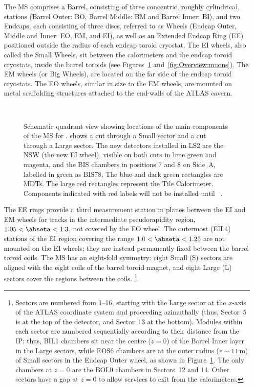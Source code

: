 \documentclass[cernpreprint, atlasdraft=false, UKenglish,british,orcidlogo, texmf, orcidlogo]{atlasdoc}
\begin{document}
The \gls{MS} comprises a Barrel, consisting of three concentric, roughly cylindrical, stations (Barrel Outer: BO, Barrel Middle: BM and Barrel Inner: BI), and two Endcaps, each consisting of three discs, referred to as Wheels (Endcap Outer, Middle and Inner: EO, EM, and EI), as well as an Extended Endcap Ring (EE) positioned outside the radius of each endcap toroid cryostat.
The EI wheels, also called the Small Wheels, sit between the calorimeters and the endcap toroid cryostats, inside the barrel toroids (see Figures~\ref{fig:Muon_quadrant} and~\ref{fig:Overview:muons}).
The EM wheels (or Big Wheels), are located on the far side of the endcap toroid cryostats. The EO wheels, similar in size to the EM wheels, are mounted on metal scaffolding structures attached to the end-walls of the ATLAS cavern.
\begin{figure}[!hp]
\centering
{} \\
 
 
\caption{Schematic quadrant view showing locations of the main components of the \gls{MS} for \RunThr. \protect{} shows a cut through a Small sector and \protect{} a cut through a Large sector. The new detectors installed in \gls{LS2} are the \gls{NSW} (the new EI wheel), visible on both cuts in lime green and magenta, and the BIS chambers in positions 7 and 8 on Side~A, labelled in green as \gls{BIS78}. The blue and dark green rectangles are \glspl{MDT}. The large red rectangles represent the Tile Calorimeter. Components indicated with red labels will not be installed until \RunFour~\cite{ATLAS-TDR-26}.
}
\label{fig:Muon_quadrant}
\end{figure}
The EE rings provide a third measurement station in planes between the EI and EM wheels for tracks in the intermediate pseudorapidity region, $1.05<\abseta < 1.3$, not covered by the EO wheel.
The outermost (\gls{EIL4}) stations of the EI region covering the range $1.0<\abseta<1.25$ are not mounted on the EI wheels; they are instead permanently fixed between the barrel toroid coils.
The \gls{MS} has an eight-fold symmetry: eight Small (S) sectors are aligned with the eight coils of the barrel toroid magnet, and eight Large (L) sectors cover the regions between the coils.
\footnote{
Sectors are numbered from \numrange{1}{16}, starting with the Large sector at the $x$-axis of the ATLAS coordinate system and proceeding azimuthally (thus, Sector~5 is at the top of the detector, and Sector~13 at the bottom).
Modules within each sector are numbered sequentially according to their distance from the \gls{IP}: thus, BIL1 chambers sit near the centre ($z=0$) of the Barrel Inner layer in the Large sectors, while EOS6 chambers are at the outer radius ($r\sim\SI{11}{\m}$) of Small sectors in the Endcap Outer wheel, as shown in Figure~\ref{fig:Muon_quadrant}.
The only chambers at $z=0$ are the BOL0 chambers in Sectors~12 and 14. Other sectors have a gap at $z=0$ to allow services to exit from the calorimeters.
}
 
\end{document}
